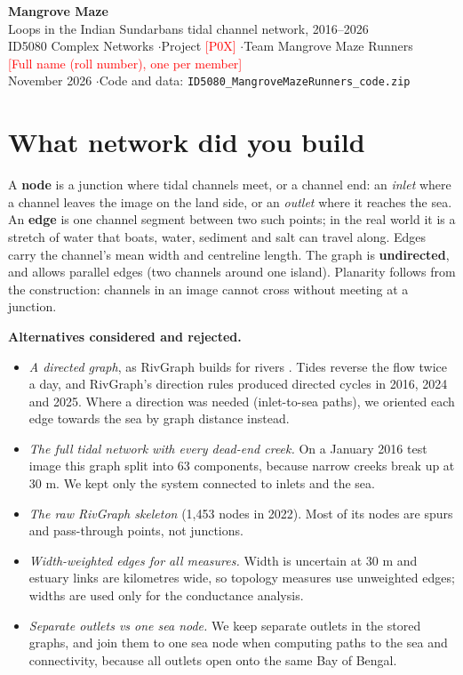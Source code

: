 \documentclass[11pt,a4paper]{article}
\newcommand{\todo}[1]{\textcolor{red}{[#1]}}
\begin{document}
\begin{center}
{\LARGE\bfseries Mangrove Maze}\\[3pt]
{\large Loops in the Indian Sundarbans tidal channel network, 2016--2026}\\[6pt]
ID5080 Complex Networks \quad$\cdot$\quad Project \todo{P0X} \quad$\cdot$\quad Team Mangrove Maze Runners\\[3pt]
\todo{Full name (roll number), one per member}\\[3pt]
November 2026 \quad$\cdot$\quad Code and data: \texttt{ID5080\_MangroveMazeRunners\_code.zip}
\end{center}

\section{What network did you build}

A \textbf{node} is a junction where tidal channels meet, or a channel end: an \emph{inlet} where a channel leaves the image on the land side, or an \emph{outlet} where it reaches the sea. An \textbf{edge} is one channel segment between two such points; in the real world it is a stretch of water that boats, water, sediment and salt can travel along. Edges carry the channel's mean width and centreline length. The graph is \textbf{undirected}, and allows parallel edges (two channels around one island). Planarity follows from the construction: channels in an image cannot cross without meeting at a junction.

\textbf{Alternatives considered and rejected.}
\begin{itemize}
  \item \emph{A directed graph}, as RivGraph builds for rivers \cite{rivgraph_esurf}. Tides reverse the flow twice a day, and RivGraph's direction rules produced directed cycles in 2016, 2024 and 2025. Where a direction was needed (inlet-to-sea paths), we oriented each edge towards the sea by graph distance instead.
  \item \emph{The full tidal network with every dead-end creek.} On a January 2016 test image this graph split into 63 components, because narrow creeks break up at 30 m. We kept only the system connected to inlets and the sea.
  \item \emph{The raw RivGraph skeleton} (1,453 nodes in 2022). Most of its nodes are spurs and pass-through points, not junctions.
  \item \emph{Width-weighted edges for all measures.} Width is uncertain at 30 m and estuary links are kilometres wide, so topology measures use unweighted edges; widths are used only for the conductance analysis.
  \item \emph{Separate outlets vs one sea node.} We keep separate outlets in the stored graphs, and join them to one sea node when computing paths to the sea and connectivity, because all outlets open onto the same Bay of Bengal.
\end{itemize}
\end{document}
